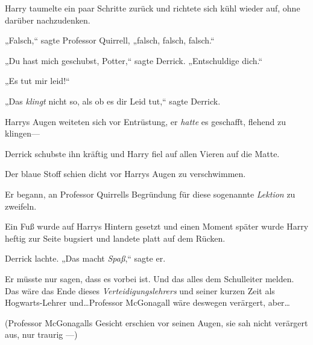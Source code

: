 Harry taumelte ein paar Schritte zurück und richtete sich kühl wieder auf, ohne darüber nachzudenken.

„Falsch,“ sagte Professor Quirrell, „falsch, falsch, falsch.“

„Du hast mich geschubst, Potter,“ sagte Derrick. „Entschuldige dich.“

„Es tut mir leid!“

„Das \emph{klingt} nicht so, als ob es dir Leid tut,“ sagte Derrick.

Harrys Augen weiteten sich vor Entrüstung, er \emph{hatte} es geschafft, flehend zu klingen—

Derrick schubste ihn kräftig und Harry fiel auf allen Vieren auf die Matte.

Der blaue Stoff schien dicht vor Harrys Augen zu verschwimmen.

Er begann, an Professor Quirrells Begründung für diese sogenannte \emph{Lektion} zu zweifeln.

Ein Fuß wurde auf Harrys Hintern gesetzt und einen Moment später wurde Harry heftig zur Seite bugsiert und landete platt auf dem Rücken.

Derrick lachte. „Das macht \emph{Spaß},“ sagte er.

Er müsste nur sagen, dass es vorbei ist. Und das alles dem Schulleiter melden. Das wäre das Ende dieses \emph{Verteidigungslehrers} und seiner kurzen Zeit als Hogwarts-Lehrer und…Professor McGonagall wäre deswegen verärgert, aber…

(Professor McGonagalls Gesicht erschien vor seinen Augen, sie sah nicht verärgert aus, nur traurig —)

